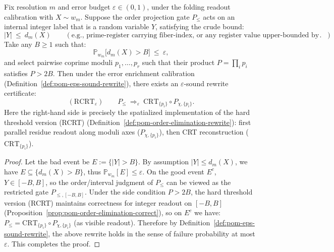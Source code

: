 \begin{proposition}\label{prop:pom-rcrt-epsilon}
Fix resolution $m$ and error budget $\varepsilon\in(0,1)$, under the folding readout calibration with $X\sim w_m$.
Suppose the order projection gate $P_{\le}$ acts on an internal integer label that is a random variable $Y$, satisfying the crude bound:
\[
|Y|\ \le\ d_m(X)
\qquad(\text{e.g., prime-register carrying fiber-index, or any register value upper-bounded by fiber size}).
\]
Take any $B\ge 1$ such that:
\[
\mathbb{P}_{w_m}\big[d_m(X)>B\big]\ \le\ \varepsilon,
\]
and select pairwise coprime moduli $p_1,\dots,p_r$ such that their product $P=\prod_i p_i$ satisfies $P>2B$.
Then under the error enrichment calibration (Definition~\ref{def:pom-eps-sound-rewrite}), there exists an $\varepsilon$-sound rewrite certificate:
\[
(\mathrm{RCRT}_\varepsilon)\qquad
P_{\le}\ \Longrightarrow_{\varepsilon}\ \mathrm{CRT}_{\{p_i\}}\circ P_{\chi,\{p_i\}}.
\]
Here the right-hand side is precisely the spatialized implementation of the hard threshold version (RCRT) (Definition~\ref{def:pom-order-elimination-rewrite}): first parallel residue readout along moduli axes ($P_{\chi,\{p_i\}}$), then CRT reconstruction ($\mathrm{CRT}_{\{p_i\}}$).
\end{proposition}
\begin{proof}
Let the bad event be $E:=\{|Y|>B\}$.
By assumption $|Y|\le d_m(X)$, we have $E\subseteq\{d_m(X)>B\}$, thus
\(
\mathbb{P}_{w_m}[E]\le \varepsilon
\).
On the good event $E^c$, $Y\in[-B,B]$, so the order/interval judgment of $P_{\le}$ can be viewed as the restricted gate $P_{\le,[-B,B]}$.
Under the side condition $P>2B$, the hard threshold version (RCRT) maintains correctness for integer readout on $[-B,B]$ (Proposition~\ref{prop:pom-order-elimination-correct}), so on $E^c$ we have:
\(
P_{\le}= \mathrm{CRT}_{\{p_i\}}\circ P_{\chi,\{p_i\}}
\)
(as visible readout).
Therefore by Definition~\ref{def:pom-eps-sound-rewrite}, the above rewrite holds in the sense of failure probability at most $\varepsilon$. This completes the proof.
\end{proof}
